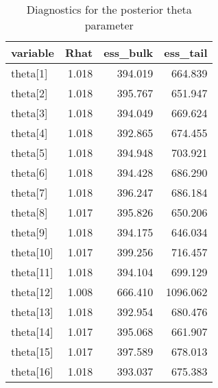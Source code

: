 \begin{table}[!h]

\caption{\label{tab:diagnostics-theta-aggregated}Diagnostics for the posterior theta parameter}
\centering
\begin{tabular}[t]{lrrr}
\toprule
variable & Rhat & ess\_bulk & ess\_tail\\
\midrule
theta[1] & 1.018 & 394.019 & 664.839\\
theta[2] & 1.018 & 395.767 & 651.947\\
theta[3] & 1.018 & 394.049 & 669.624\\
theta[4] & 1.018 & 392.865 & 674.455\\
theta[5] & 1.018 & 394.948 & 703.921\\
theta[6] & 1.018 & 394.428 & 686.290\\
theta[7] & 1.018 & 396.247 & 686.184\\
theta[8] & 1.017 & 395.826 & 650.206\\
theta[9] & 1.018 & 394.175 & 646.034\\
theta[10] & 1.017 & 399.256 & 716.457\\
theta[11] & 1.018 & 394.104 & 699.129\\
theta[12] & 1.008 & 666.410 & 1096.062\\
theta[13] & 1.018 & 392.954 & 680.476\\
theta[14] & 1.017 & 395.068 & 661.907\\
theta[15] & 1.017 & 397.589 & 678.013\\
theta[16] & 1.018 & 393.037 & 675.383\\
\bottomrule
\end{tabular}
\end{table}
